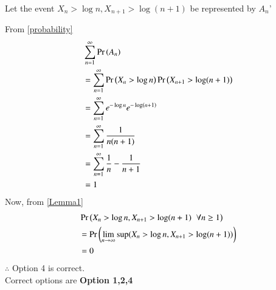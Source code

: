 \documentclass[journal,12pt,twocolumn]{IEEEtran}
\begin{document}
\begin{enumerate}
    Let the event $X_n > \log n,X_{n+1}>\log (n+1)$ be represented by $A_n$'
    
    From \eqref{probability}
    \begin{align}
        &\sum_{n=1}^{\infty}\Pr\left(A_n\right)\\
        &= \sum_{n=1}^{\infty}\Pr\left(X_n>\log n\right)\Pr\left(X_{n+1}>\log (n+1)\right)\\
        &=\sum_{n=1}^{\infty}e^{-\log n}e^{-\log (n+1)}\\
        &=\sum_{n=1}^{\infty}\frac{1}{n(n+1)}\\
        &=\sum_{n=1}^{\infty}\frac{1}{n}-\frac{1}{n+1}\\
        &=1
    \end{align}
    Now, from \ref{Lemma1}
    \begin{align}
        &\Pr\left(X_n>\log n,X_{n+1}>\log (n+1)\hspace{0.2cm}\forall n\geq1\right)\\
        &=\Pr\left(\lim_{n \rightarrow \infty}\sup ( X_n>\log n,X_{n+1}>\log (n+1))\right)\\
        &=0
    \end{align}
    $\therefore$ Option 4 is correct.\\
    Correct options are \textbf{Option 1,2,4}
\end{enumerate}
\end{document}
